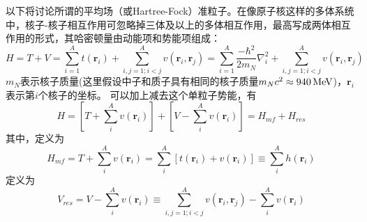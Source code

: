 以下将讨论所谓的平均场（或Hartree-Fock）准粒子。在像原子核这样的多体系统中，核子-核子相互作用可忽略掉三体及以上的多体相互作用，最高写成两体相互作用的形式，其哈密顿量由动能项和势能项组成：
\begin{equation}
	H = T + V = \sum_{i = 1}^{A} t(\bm{r}_i) + \sum_{i, j = 1; i < j}^{A} v(\bm{r}_i, \bm{r}_j) =  \sum_{i = 1}^{A} \frac{-\hbar^2}{2m_N}\nabla_i^2 + \sum_{i, j = 1; i < j}^{A} v(\bm{r}_i, \bm{r}_j) 
\end{equation}
$m_N$表示核子质量(这里假设中子和质子具有相同的核子质量$m_N c^2 \approx 940\, \rm{MeV}$)，$\bm{r}_i$表示第$i$个核子的坐标。
可以加上减去这个单粒子势能，有
\begin{equation}
	H = \left[T + \sum_{i}^{A}v(\bm{r}_i) \right] + \left[V - \sum_{i}^{A} v(\bm{r}_i)\right]
	= H_{mf} + H_{res}
\end{equation}
其中，定义为
\begin{equation}
	H_{mf} = T + \sum_{i}^{A} v(\bm{r}_i) = \sum_{i}^{A}\left[t(\bm{r}_i) + v(\bm{r}_i)\right] \equiv \sum_{i}^{A} h(\bm{r}_i)
	\label{eq:mf-hamil}
\end{equation}
定义为
\begin{equation}
	V_{res} = V - \sum_{i}^{A} v(\bm{r}_i) \equiv \sum_{i, j = 1; i < j}^{A} v(\bm{r}_i, \bm{r}_j) - \sum_{i}^{A}v(\bm{r}_i)
\end{equation}

